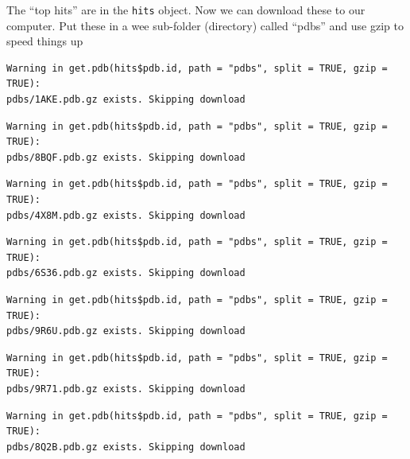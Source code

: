 \documentclass[
  letterpaper,
  DIV=11,
  numbers=noendperiod]{scrartcl}
\newenvironment{Shaded}{\begin{snugshade}}{\end{snugshade}}
\newcommand{\AttributeTok}[1]{\textcolor[rgb]{0.40,0.45,0.13}{#1}}
\newcommand{\CommentTok}[1]{\textcolor[rgb]{0.37,0.37,0.37}{#1}}
\newcommand{\ConstantTok}[1]{\textcolor[rgb]{0.56,0.35,0.01}{#1}}
\newcommand{\FunctionTok}[1]{\textcolor[rgb]{0.28,0.35,0.67}{#1}}
\newcommand{\NormalTok}[1]{\textcolor[rgb]{0.00,0.23,0.31}{#1}}
\newcommand{\OtherTok}[1]{\textcolor[rgb]{0.00,0.23,0.31}{#1}}
\newcommand{\SpecialCharTok}[1]{\textcolor[rgb]{0.37,0.37,0.37}{#1}}
\newcommand{\StringTok}[1]{\textcolor[rgb]{0.13,0.47,0.30}{#1}}
\begin{document}
The ``top hits'' are in the \texttt{hits} object. Now we can download
these to our computer. Put these in a wee sub-folder (directory) called
``pdbs'' and use gzip to speed things up

\begin{Shaded}
\end{Shaded}

\begin{verbatim}
Warning in get.pdb(hits$pdb.id, path = "pdbs", split = TRUE, gzip = TRUE):
pdbs/1AKE.pdb.gz exists. Skipping download
\end{verbatim}

\begin{verbatim}
Warning in get.pdb(hits$pdb.id, path = "pdbs", split = TRUE, gzip = TRUE):
pdbs/8BQF.pdb.gz exists. Skipping download
\end{verbatim}

\begin{verbatim}
Warning in get.pdb(hits$pdb.id, path = "pdbs", split = TRUE, gzip = TRUE):
pdbs/4X8M.pdb.gz exists. Skipping download
\end{verbatim}

\begin{verbatim}
Warning in get.pdb(hits$pdb.id, path = "pdbs", split = TRUE, gzip = TRUE):
pdbs/6S36.pdb.gz exists. Skipping download
\end{verbatim}

\begin{verbatim}
Warning in get.pdb(hits$pdb.id, path = "pdbs", split = TRUE, gzip = TRUE):
pdbs/9R6U.pdb.gz exists. Skipping download
\end{verbatim}

\begin{verbatim}
Warning in get.pdb(hits$pdb.id, path = "pdbs", split = TRUE, gzip = TRUE):
pdbs/9R71.pdb.gz exists. Skipping download
\end{verbatim}

\begin{verbatim}
Warning in get.pdb(hits$pdb.id, path = "pdbs", split = TRUE, gzip = TRUE):
pdbs/8Q2B.pdb.gz exists. Skipping download
\end{verbatim}
\end{document}
